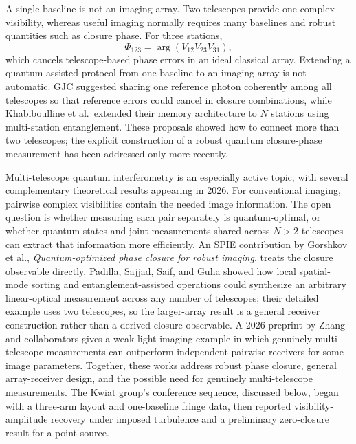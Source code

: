 \documentclass[]{spie}
\newcommand{\etal}{et al.}
\begin{document}
A single baseline is not an imaging array. Two telescopes provide one complex visibility, whereas useful imaging normally requires many baselines and robust quantities such as closure phase.\cite{Jennison1958,MonnierPhases} For three stations,
\begin{equation}
    \Phi_{123}=\arg\left(V_{12}V_{23}V_{31}\right),
    \label{eq:closure}
\end{equation}
which cancels telescope-based phase errors in an ideal classical array. Extending a quantum-assisted protocol from one baseline to an imaging array is not automatic. GJC suggested sharing one reference photon coherently among all telescopes so that reference errors could cancel in closure combinations, while Khabiboulline \etal\ extended their memory architecture to $N$ stations using multi-station entanglement.\cite{Gottesman2012,Khabiboulline2019PRA} These proposals showed how to connect more than two telescopes; the explicit construction of a robust quantum closure-phase measurement has been addressed only more recently.

Multi-telescope quantum interferometry is an especially active topic, with several complementary theoretical results appearing in 2026. For conventional imaging, pairwise complex visibilities contain the needed image information. The open question is whether measuring each pair separately is quantum-optimal, or whether quantum states and joint measurements shared across $N>2$ telescopes can extract that information more efficiently. An SPIE contribution by Gorshkov \etal, \textit{Quantum-optimized phase closure for robust imaging}, treats the closure observable directly.\cite{Gorshkov2026PhaseClosure} Padilla, Sajjad, Saif, and Guha showed how local spatial-mode sorting and entanglement-assisted operations could synthesize an arbitrary linear-optical measurement across any number of telescopes; their detailed example uses two telescopes, so the larger-array result is a general receiver construction rather than a derived closure observable.\cite{Padilla2026} A 2026 preprint by Zhang and collaborators gives a weak-light imaging example in which genuinely multi-telescope measurements can outperform independent pairwise receivers for some image parameters.\cite{ZhangMultiTelescope2026} Together, these works address robust phase closure, general array-receiver design, and the possible need for genuinely multi-telescope measurements. The Kwiat group's conference sequence, discussed below, began with a three-arm layout and one-baseline fringe data, then reported visibility-amplitude recovery under imposed turbulence and a preliminary zero-closure result for a point source.\cite{Diaz2021,Diaz2022,Diaz2024Poster}
\end{document}
